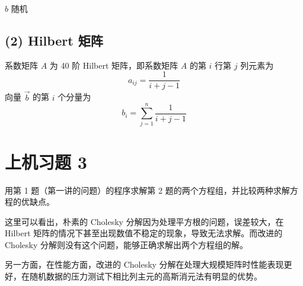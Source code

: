 \documentclass{article}
\begin{document}
$b$ 随机

\subsection*{(2) Hilbert 矩阵}

系数矩阵 $A$ 为 40 阶 Hilbert 矩阵，即系数矩阵 $A$ 的第 $i$ 行第 $j$ 列元素为
\[
  a_{ij} = \frac{1}{i+j-1}
\]
向量 $\vec{b}$ 的第 $i$ 个分量为
\[
  b_i = \sum_{j=1}^{n} \frac{1}{i+j-1}
\]

\begin{solution}
  \mbox{}
  
\end{solution}

\section{上机习题 3}

用第 1 题（第一讲的问题）的程序求解第 2 题的两个方程组，并比较两种求解方程的优缺点。

\begin{solution}
  \mbox{}
  
  

  这里可以看出，朴素的 Cholesky 分解因为处理平方根的问题，误差较大，在 Hilbert
  矩阵的情况下甚至出现数值不稳定的现象，导致无法求解。而改进的 Cholesky 分解则没有这个问题，能够正确求解出两个方程组的解。

  另一方面，在性能方面，改进的 Cholesky 分解在处理大规模矩阵时性能表现更好，在随机数据的压力测试下相比列主元的高斯消元法有明显的优势。
\end{solution}
\end{document}
